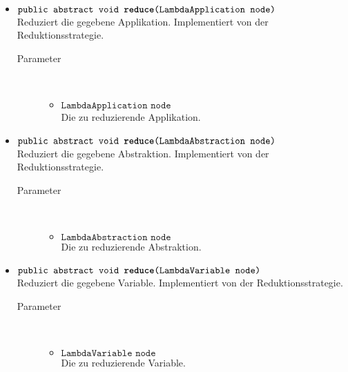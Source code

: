 \begin{description}
\begin{itemize}
		\item $\texttt{public abstract void \textbf{reduce}(LambdaApplication node)}$ \\ Reduziert die gegebene Applikation. Implementiert von der Reduktionsstrategie.
		\begin{description}
			\item[Parameter] \hfill \\
			\vspace{-.8cm}
			\begin{itemize}
				\item $\texttt{LambdaApplication node}$ \\ Die zu reduzierende Applikation.
			\end{itemize}
		\end{description}
		
		\item $\texttt{public abstract void \textbf{reduce}(LambdaAbstraction node)}$ \\ Reduziert die gegebene Abstraktion. Implementiert von der Reduktionsstrategie.
		\begin{description}
			\item[Parameter] \hfill \\
			\vspace{-.8cm}
			\begin{itemize}
				\item $\texttt{LambdaAbstraction node}$ \\ Die zu reduzierende Abstraktion.
			\end{itemize}
		\end{description}
		
		\item $\texttt{public abstract void \textbf{reduce}(LambdaVariable node)}$ \\ Reduziert die gegebene Variable. Implementiert von der Reduktionsstrategie.
		\begin{description}
			\item[Parameter] \hfill \\
			\vspace{-.8cm}
			\begin{itemize}
				\item $\texttt{LambdaVariable node}$ \\ Die zu reduzierende Variable.
			\end{itemize}
		\end{description}
	\end{itemize}
\end{description}